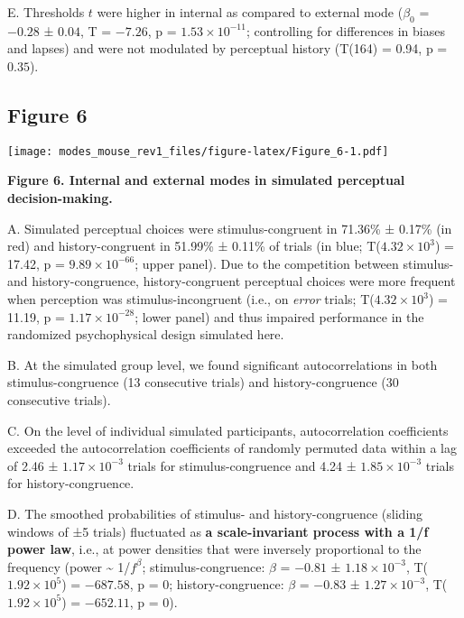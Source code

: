 \documentclass[
]{article}
\begin{document}
E. Thresholds \(t\) were higher in internal as compared to external mode
(\(\beta_0\) = \(-0.28\) ± \(0.04\), T = \(-7.26\), p =
\(\ensuremath{1.53\times 10^{-11}}\); controlling for differences in
biases and lapses) and were not modulated by perceptual history (T(164)
= 0.94, p = \(0.35\)).

\newpage

\hypertarget{figure-6}{%
\subsection{Figure 6}\label{figure-6}}

\texttt{[image: modes\_mouse\_rev1\_files/figure-latex/Figure\_6-1.pdf]}

\textbf{Figure 6. Internal and external modes in simulated perceptual
decision-making.}

A. Simulated perceptual choices were stimulus-congruent in 71.36\% ±
0.17\% (in red) and history-congruent in 51.99\% ± 0.11\% of trials (in
blue; T(\ensuremath{4.32\times 10^{3}}) = 17.42, p =
\(\ensuremath{9.89\times 10^{-66}}\); upper panel). Due to the
competition between stimulus- and history-congruence, history-congruent
perceptual choices were more frequent when perception was
stimulus-incongruent (i.e., on \emph{error} trials;
T(\ensuremath{4.32\times 10^{3}}) = 11.19, p =
\(\ensuremath{1.17\times 10^{-28}}\); lower panel) and thus impaired
performance in the randomized psychophysical design simulated here.

B. At the simulated group level, we found significant autocorrelations
in both stimulus-congruence (13 consecutive trials) and
history-congruence (30 consecutive trials).

C. On the level of individual simulated participants, autocorrelation
coefficients exceeded the autocorrelation coefficients of randomly
permuted data within a lag of 2.46 ± \ensuremath{1.17\times 10^{-3}}
trials for stimulus-congruence and 4.24 ±
\ensuremath{1.85\times 10^{-3}} trials for history-congruence.

D. The smoothed probabilities of stimulus- and history-congruence
(sliding windows of ±5 trials) fluctuated as \textbf{a scale-invariant
process with a 1/f power law}, i.e., at power densities that were
inversely proportional to the frequency (power \textasciitilde{}
1/\(f^\beta\); stimulus-congruence: \(\beta\) = \(-0.81\) ±
\(\ensuremath{1.18\times 10^{-3}}\),
T(\(\ensuremath{1.92\times 10^{5}}\)) = \(-687.58\), p = \(0\);
history-congruence: \(\beta\) = \(-0.83\) ±
\(\ensuremath{1.27\times 10^{-3}}\),
T(\(\ensuremath{1.92\times 10^{5}}\)) = \(-652.11\), p = \(0\)).
\end{document}
